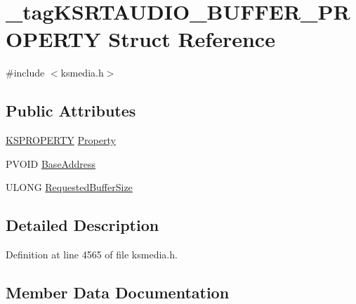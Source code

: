 \hypertarget{struct__tag_k_s_r_t_a_u_d_i_o___b_u_f_f_e_r___p_r_o_p_e_r_t_y}{}\section{\+\_\+tag\+K\+S\+R\+T\+A\+U\+D\+I\+O\+\_\+\+B\+U\+F\+F\+E\+R\+\_\+\+P\+R\+O\+P\+E\+R\+TY Struct Reference}
\label{struct__tag_k_s_r_t_a_u_d_i_o___b_u_f_f_e_r___p_r_o_p_e_r_t_y}


{\ttfamily \#include $<$ksmedia.\+h$>$}

\subsection*{Public Attributes}
\begin{DoxyCompactItemize}
\item 
\hyperlink{ks_8h_a4392f77c74e868d813d46c39ada4d660}{K\+S\+P\+R\+O\+P\+E\+R\+TY} \hyperlink{struct__tag_k_s_r_t_a_u_d_i_o___b_u_f_f_e_r___p_r_o_p_e_r_t_y_af0961b1625dd12950ac3bbdcf6f26009}{Property}
\item 
P\+V\+O\+ID \hyperlink{struct__tag_k_s_r_t_a_u_d_i_o___b_u_f_f_e_r___p_r_o_p_e_r_t_y_a10af10450a1ef0ce358bf309f6994422}{Base\+Address}
\item 
U\+L\+O\+NG \hyperlink{struct__tag_k_s_r_t_a_u_d_i_o___b_u_f_f_e_r___p_r_o_p_e_r_t_y_a5c070ce4bebde4a5126cbe327a6e479e}{Requested\+Buffer\+Size}
\end{DoxyCompactItemize}


\subsection{Detailed Description}


Definition at line 4565 of file ksmedia.\+h.



\subsection{Member Data Documentation}

